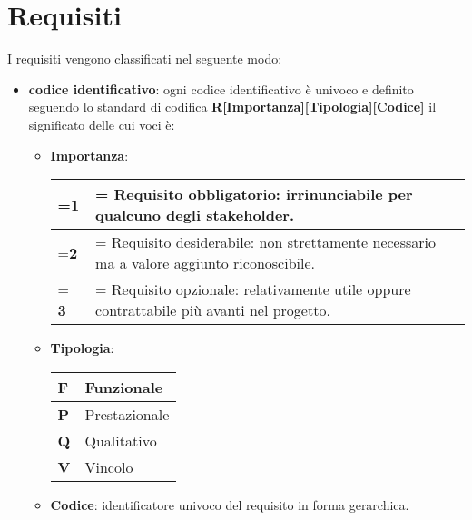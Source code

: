 \section{Requisiti}

    I requisiti vengono classificati nel seguente modo:
    \begin{itemize}
        \item \textbf{codice identificativo}: ogni codice identificativo è univoco e definito seguendo lo standard di codifica \textbf{R[Importanza][Tipologia][Codice]}  il significato delle cui voci è:
        \begin{itemize}
            \item \textbf{Importanza}:
            \begin{center}
                \renewcommand{\arraystretch}{1.8}
                \renewcommand\tabularxcolumn[1]{m{#1}}
                \begin{tabularx}{0.85\textwidth} {
                    >{\hsize=0.1\hsize\linewidth=\hsize}X
                    >{\hsize=1.9\hsize\linewidth=\hsize}X
                }
                    \hline
                    \textbf{1} & Requisito obbligatorio: irrinunciabile per qualcuno degli stakeholder. \\
                    \hline
                    \textbf{2} & Requisito desiderabile: non strettamente necessario ma  a valore aggiunto riconoscibile. \\
                    \hline
                    \textbf{3} &  Requisito opzionale: relativamente utile oppure contrattabile più avanti nel progetto. \\
                    \hline
                \end{tabularx}
            \end{center}

            \item \textbf{Tipologia}:
            \begin{center}
                \renewcommand{\arraystretch}{1.5}
                \begin{tabular}{m{2em} m{10em}}
                    \hline
                    \textbf{F} & Funzionale \\
                    \hline
                    \textbf{P} & Prestazionale \\
                    \hline
                    \textbf{Q} & Qualitativo \\
                    \hline
                    \textbf{V} &  Vincolo \\
                    \hline
                \end{tabular}
            \end{center}
            \item \textbf{Codice}: identificatore univoco del requisito in forma gerarchica.
        \end{itemize}


\end{itemize}
